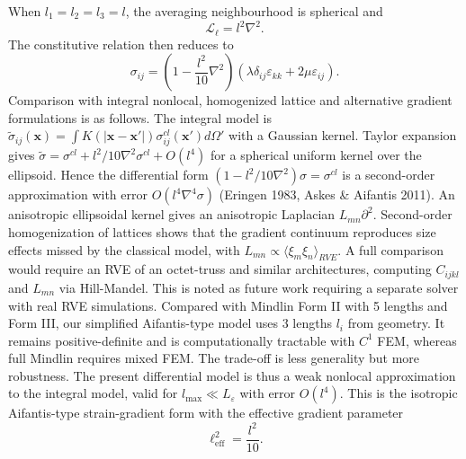 \documentclass[final,3p,times,fleqn]{elsarticle}
\newcommand{\rev}[1]{\textcolor{revcolor}{#1}}
\begin{document}
When $l_1=l_2=l_3=l$, the averaging neighbourhood is spherical and
\begin{equation}\label{eq:spherical_operator}
\mathcal{L}_{\ell}
=
l^2\nabla^2.
\end{equation}
The constitutive relation then reduces to
\begin{equation}\label{eq:spherical}
\sigma_{ij}
=
\left(
1-\frac{l^2}{10}\nabla^2
\right)
\left(
\lambda\delta_{ij}\varepsilon_{kk}
+
2\mu\varepsilon_{ij}
\right).
\end{equation}
\rev{Comparison with integral nonlocal, homogenized lattice and alternative gradient formulations is as follows. The integral model is $\tilde{\sigma}_{ij}(\mathbf{x})=\int K(|\mathbf{x}-\mathbf{x}'|)\sigma^{cl}_{ij}(\mathbf{x}')d\Omega'$ with a Gaussian kernel. Taylor expansion gives $\tilde{\sigma}=\sigma^{cl}+l^2/10\nabla^2\sigma^{cl}+O(l^4)$ for a spherical uniform kernel over the ellipsoid. Hence the differential form $(1- l^2/10\nabla^2)\sigma=\sigma^{cl}$ is a second-order approximation with error $O(l^4\nabla^4\sigma)$ (Eringen 1983, Askes \& Aifantis 2011). An anisotropic ellipsoidal kernel gives an anisotropic Laplacian $L_{mn}\partial^2$. Second-order homogenization of lattices \cite{Molavitabrizi2023} shows that the gradient continuum reproduces size effects missed by the classical model, with $L_{mn}\propto\langle\xi_m\xi_n\rangle_{RVE}$. A full comparison would require an RVE of an octet-truss and similar architectures, computing $C_{ijkl}$ and $L_{mn}$ via Hill-Mandel. This is noted as future work requiring a separate solver with real RVE simulations. Compared with Mindlin Form II with 5 lengths and Form III, our simplified Aifantis-type model uses 3 lengths $l_i$ from geometry. It remains positive-definite and is computationally tractable with $C^1$ FEM, whereas full Mindlin requires mixed FEM. The trade-off is less generality but more robustness. The present differential model is thus a weak nonlocal approximation to the integral model, valid for $l_{\max}\ll L_{\varepsilon}$ with error $O(l^4)$.}
This is the isotropic Aifantis-type strain-gradient form
\cite{Aifantis1992,AltanAifantis1997,AskesAifantis2011} with the
effective gradient parameter
\begin{equation}\label{eq:effective_length}
\ell_{\mathrm{eff}}^2
=
\frac{l^2}{10}.
\end{equation}

\end{document}
